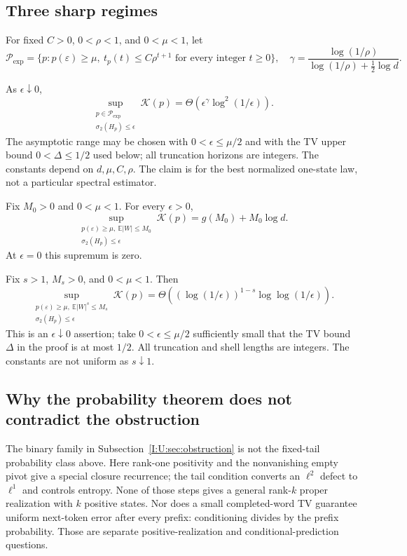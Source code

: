 \subsection{Three sharp regimes}
For fixed $C>0$, $0<\rho<1$, and $0<\mu<1$, let
\[
 \mathcal P_{\exp}=\{p:p(\varepsilon)\ge\mu,
       \ t_p(t)\le C\rho^{t+1}\text{ for every integer }t\ge0\},
 \quad \gamma=\frac{\log(1/\rho)}{\log(1/\rho)+\tfrac12\log d}.
\]
\begin{theorem}\label{II:U:thm:kl-exp}
As $\epsilon\downarrow0$,
\[
 \sup_{\substack{p\in\mathcal P_{\exp}\\\sigma_2(H_p)\le\epsilon}}
 \mathcal K(p)
 =\Theta\!\left(\epsilon^\gamma\log^2(1/\epsilon)\right).
\]
The asymptotic range may be chosen with $0<\epsilon\le\mu/2$ and with the TV upper bound $0<\Delta\le1/2$ used below; all truncation horizons are integers. The constants depend on $d,\mu,C,\rho$. The claim is for the best
normalized one-state law, not a particular spectral estimator.
\end{theorem}



\begin{theorem}\label{II:U:thm:kl-mean}
Fix $M_0>0$ and $0<\mu<1$. For every $\epsilon>0$,
\[
 \sup_{\substack{p(\varepsilon)\ge\mu,\ \mathbb E|W|\le M_0\\
                      \sigma_2(H_p)\le\epsilon}}\mathcal K(p)
 =g(M_0)+M_0\log d.
\]
At $\epsilon=0$ this supremum is zero.
\end{theorem}


\begin{theorem}\label{II:U:thm:kl-moment}
Fix $s>1$, $M_s>0$, and $0<\mu<1$. Then
\[
 \sup_{\substack{p(\varepsilon)\ge\mu,\ \mathbb E|W|^s\le M_s\\
                      \sigma_2(H_p)\le\epsilon}}\mathcal K(p)
 =\Theta\!\left((\log(1/\epsilon))^{1-s}
                     \log\log(1/\epsilon)\right).
\]
This is an $\epsilon\downarrow0$ assertion; take $0<\epsilon\le\mu/2$ sufficiently small that the TV bound $\Delta$ in the proof is at most $1/2$. All truncation and shell lengths are integers. The constants are not uniform as $s\downarrow1$.
\end{theorem}


\subsection{Why the probability theorem does not contradict the obstruction}
The binary family in Subsection~\ref{I:U:sec:obstruction} is not the fixed-tail
probability class above. Here rank-one positivity and the nonvanishing empty
pivot give a special closure recurrence; the tail condition converts an
$\ell^2$ defect to $\ell^1$ and controls entropy. None of those steps gives a
general rank-$k$ proper realization with $k$ positive states. Nor does a
small completed-word TV guarantee uniform next-token error after every
prefix: conditioning divides by the prefix probability. Those are separate
positive-realization and conditional-prediction questions.
